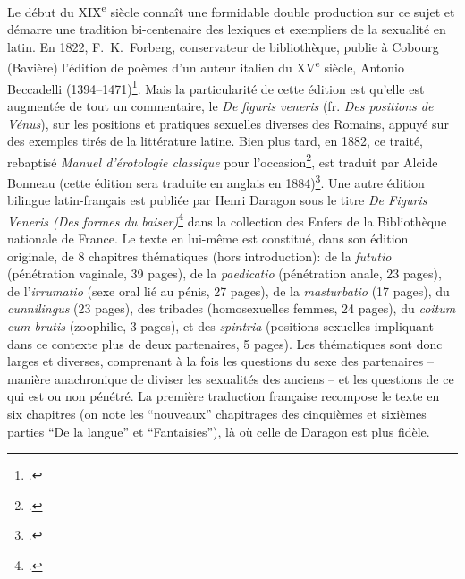 Le début du XIX\textsuperscript{e} siècle connaît une formidable double production sur ce sujet et démarre une tradition bi-centenaire des lexiques et exempliers de la sexualité en latin. En 1822, F.~K.~Forberg, conservateur de bibliothèque, publie à Cobourg (Bavière) l'édition de poèmes d'un auteur italien du XV\textsuperscript{e} siècle, Antonio Beccadelli (1394--1471)\footcite{beccadelli_antonii_1824}. Mais la particularité de cette édition est qu'elle est augmentée de tout un commentaire, le \textit{De figuris veneris} (fr. \textit{Des positions de Vénus}), sur les positions et pratiques sexuelles diverses des Romains, appuyé sur des exemples tirés de la littérature latine. Bien plus tard, en 1882, ce traité, rebaptisé \textit{Manuel d'érotologie classique} pour l'occasion\footcite{forberg_manuel_1882}, est traduit par Alcide Bonneau (cette édition sera traduite en anglais en 1884)\footcite{parra1997figuris}. Une autre édition bilingue latin-français est publiée par Henri Daragon sous le titre \textit{De Figuris Veneris (Des formes du baiser)}\footcite{forberg_f_1907} dans la collection des Enfers de la Bibliothèque nationale de France. Le texte en lui-même est constitué, dans son édition originale, de 8 chapitres thématiques (hors introduction): de la \textit{fututio} (pénétration vaginale, 39 pages), de la \textit{paedicatio} (pénétration anale, 23 pages), de l'\textit{irrumatio} (sexe oral lié au pénis, 27 pages), de la \textit{masturbatio} (17 pages), du \textit{cunnilingus} (23 pages), des tribades (homosexuelles femmes, 24 pages), du \textit{coitum cum brutis} (zoophilie, 3 pages), et des \textit{spintria} (positions sexuelles impliquant dans ce contexte plus de deux partenaires, 5 pages). Les thématiques sont donc larges et diverses, comprenant à la fois les questions du sexe des partenaires -- manière anachronique de diviser les sexualités des anciens -- et les questions de ce qui est ou non pénétré. La première traduction française recompose le texte en six chapitres (on note les \enquote{nouveaux} chapitrages des cinquièmes et sixièmes parties \enquote{De la langue} et \enquote{Fantaisies}), là où celle de Daragon est plus fidèle.


